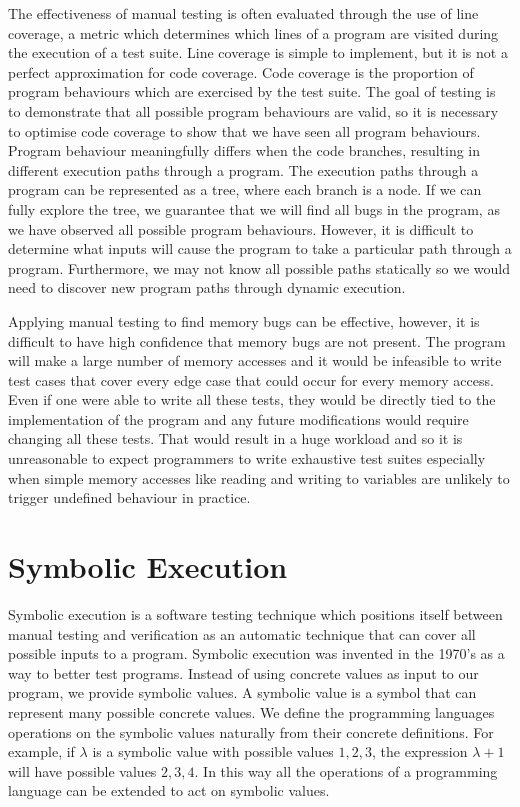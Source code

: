 \documentclass[12pt,twoside]{report}
\begin{document}
The effectiveness of manual testing is often evaluated through the use of line coverage, a metric which determines which lines of a program are visited during the execution of a test suite. Line coverage is simple to implement, but it is not a perfect approximation for code coverage. Code coverage is the proportion of program behaviours which are exercised by the test suite. The goal of testing is to demonstrate that all possible program behaviours are valid, so it is necessary to optimise code coverage to show that we have seen all program behaviours. Program behaviour meaningfully differs when the code branches, resulting in different execution paths through a program. The execution paths through a program can be represented as a tree, where each branch is a node. If we can fully explore the tree, we guarantee that we will find all bugs in the program, as we have observed all possible program behaviours. However, it is difficult to determine what inputs will cause the program to take a particular path through a program. Furthermore, we may not know all possible paths statically so we would need to discover new program paths through dynamic execution.

Applying manual testing to find memory bugs can be effective, however, it is difficult to have high confidence that memory bugs are not present. The program will make a large number of memory accesses and it would be infeasible to write test cases that cover every edge case that could occur for every memory access. Even if one were able to write all these tests, they would be directly tied to the implementation of the program and any future modifications would require changing all these tests. That would result in a huge workload and so it is unreasonable to expect programmers to write exhaustive test suites especially when simple memory accesses like reading and writing to variables are unlikely to trigger undefined behaviour in practice.

\section{Symbolic Execution}
Symbolic execution is a software testing technique which positions itself between manual testing and verification as an automatic technique that can cover all possible inputs to a program. Symbolic execution was invented in the 1970's \cite{10.1145/800027.808444, 10.1145/360248.360252, 1702443, 10.1145/800027.808445} as a way to better test programs. Instead of using concrete values as input to our program, we provide symbolic values. A symbolic value is a symbol that can represent many possible concrete values. We define the programming languages operations on the symbolic values naturally from their concrete definitions. For example, if $\lambda$ is a symbolic value with possible values $1,2,3$, the expression $\lambda + 1$ will have possible values $2,3,4$. In this way all the operations of a programming language can be extended to act on symbolic values.
\end{document}
